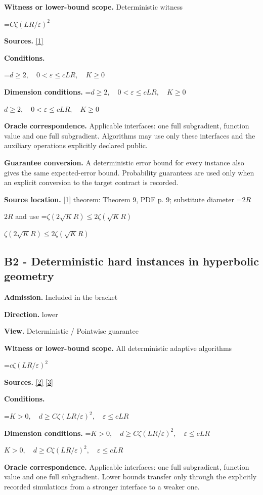 \documentclass[10pt,a4paper]{article}
\newcommand{\AtlasMath}[1]{\par\begingroup\centering\setbox0=\hbox{$\displaystyle #1$}\ifdim\wd0>1.4\linewidth\typeout{ATLAS WIDE FORMULA: \the\wd0}\fi\ifdim\wd0>\linewidth\resizebox{\linewidth}{!}{\box0}\else\box0\fi\par\endgroup}
\newcommand{\AtlasInlineMath}[1]{\begingroup\setbox0=\hbox{$#1$}\ifdim\wd0>.4\linewidth\endgroup\AtlasMath{#1}\else\endgroup$#1$\fi}
\begin{document}
\textbf{Witness or lower-bound scope.} Deterministic witness

\AtlasMath{C\zeta(LR/\varepsilon)^2}
\textbf{Sources.} \href{https://proceedings.mlr.press/v49/zhang16b.pdf}{[1]}

\textbf{Conditions.} 
\AtlasMath{d\ge2,\quad0<\varepsilon\le cLR,\quad K\ge0}


\textbf{Dimension conditions.} \AtlasInlineMath{d\ge2,\quad0<\varepsilon\le cLR,\quad K\ge0}

\textbf{Oracle correspondence.} Applicable interfaces: one full subgradient, function value and one full subgradient. Algorithms may use only these interfaces and the auxiliary operations explicitly declared public.

\textbf{Guarantee conversion.} A deterministic error bound for every instance also gives the same expected-error bound. Probability guarantees are used only when an explicit conversion to the target contract is recorded.

\textbf{Source location.} \href{https://proceedings.mlr.press/v49/zhang16b.pdf}{[1]} theorem: Theorem 9, PDF p. 9; substitute diameter \AtlasInlineMath{2R} and use \AtlasInlineMath{\zeta(2\sqrt K R)\le2\zeta(\sqrt K R)}

\subsection{B2 - Deterministic hard instances in hyperbolic geometry}
\textbf{Admission.} Included in the bracket

\textbf{Direction.} lower

\textbf{View.} Deterministic / Pointwise guarantee

\textbf{Witness or lower-bound scope.} All deterministic adaptive algorithms

\AtlasMath{c\zeta(LR/\varepsilon)^2}
\textbf{Sources.} \href{https://arxiv.org/pdf/2610.12184v3}{[2]} \href{https://arxiv.org/pdf/2610.26815v1}{[3]}

\textbf{Conditions.} 
\AtlasMath{K>0,\quad d\ge C\zeta(LR/\varepsilon)^2,\quad\varepsilon\le cLR}


\textbf{Dimension conditions.} \AtlasInlineMath{K>0,\quad d\ge C\zeta(LR/\varepsilon)^2,\quad\varepsilon\le cLR}

\textbf{Oracle correspondence.} Applicable interfaces: one full subgradient, function value and one full subgradient. Lower bounds transfer only through the explicitly recorded simulations from a stronger interface to a weaker one.
\end{document}
